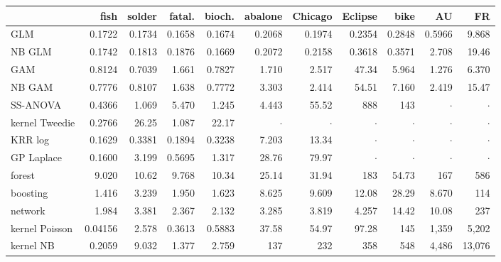 \begin{tabular}{@{}lrrrrrrrrrr@{}}
\toprule
 & fish & solder & fatal. & bioch. & abalone & Chicago & Eclipse & bike & AU & FR \\
\midrule
GLM & 0.1722 & 0.1734 & 0.1658 & 0.1674 & 0.2068 & 0.1974 & 0.2354 & 0.2848 & 0.5966 & 9.868 \\
NB GLM & 0.1742 & 0.1813 & 0.1876 & 0.1669 & 0.2072 & 0.2158 & 0.3618 & 0.3571 & 2.708 & 19.46 \\
GAM & 0.8124 & 0.7039 & 1.661 & 0.7827 & 1.710 & 2.517 & 47.34 & 5.964 & 1.276 & 6.370 \\
NB GAM & 0.7776 & 0.8107 & 1.638 & 0.7772 & 3.303 & 2.414 & 54.51 & 7.160 & 2.419 & 15.47 \\
SS-ANOVA & 0.4366 & 1.069 & 5.470 & 1.245 & 4.443 & 55.52 & 888 & 143 & $\cdot$ & $\cdot$ \\
kernel Tweedie & 0.2766 & 26.25 & 1.087 & 22.17 & $\cdot$ & $\cdot$ & $\cdot$ & $\cdot$ & $\cdot$ & $\cdot$ \\
KRR log & 0.1629 & 0.3381 & 0.1894 & 0.3238 & 7.203 & 13.34 & $\cdot$ & $\cdot$ & $\cdot$ & $\cdot$ \\
GP Laplace & 0.1600 & 3.199 & 0.5695 & 1.317 & 28.76 & 79.97 & $\cdot$ & $\cdot$ & $\cdot$ & $\cdot$ \\
forest & 9.020 & 10.62 & 9.768 & 10.34 & 25.14 & 31.94 & 183 & 54.73 & 167 & 586 \\
boosting & 1.416 & 3.239 & 1.950 & 1.623 & 8.625 & 9.609 & 12.08 & 28.29 & 8.670 & 114 \\
network & 1.984 & 3.381 & 2.367 & 2.132 & 3.285 & 3.819 & 4.257 & 14.42 & 10.08 & 237 \\
kernel Poisson & 0.04156 & 2.578 & 0.3613 & 0.5883 & 37.58 & 54.97 & 97.28 & 145 & 1{,}359 & 5{,}202 \\
kernel NB & 0.2059 & 9.032 & 1.377 & 2.759 & 137 & 232 & 358 & 548 & 4{,}486 & 13{,}076 \\
\bottomrule
\end{tabular}
